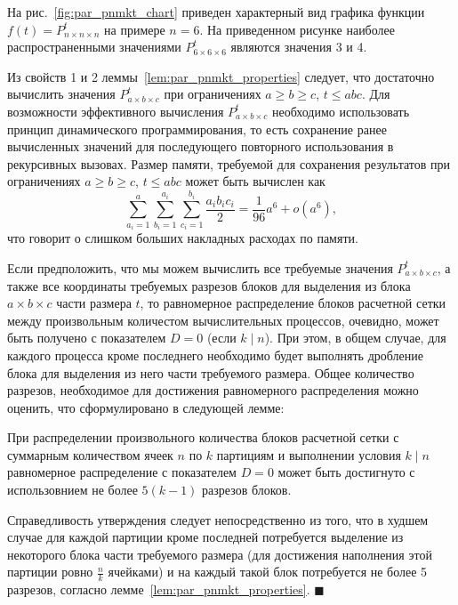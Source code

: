 На рис.~\ref{fig:par_pnmkt_chart} приведен характерный вид графика функции $f(t) = P_{n \times n \times n}^t$ на примере $n = 6$.
На приведенном рисунке наиболее распространенными значениями $P_{6 \times 6 \times 6}^t$ являются значения 3 и 4.

Из свойств 1 и 2 леммы~\ref{lem:par_pnmkt_properties} следует, что достаточно вычислить значения $P_{a \times b \times c}^t$ при ограничениях $a \ge b \ge c$, $t \le abc$.
Для возможности эффективного вычисления $P_{a \times b \times c}^t$ необходимо использовать принцип динамического программирования, то есть сохранение ранее вычисленных значений для последующего повторного использования в рекурсивных вызовах.
Размер памяти, требуемой для сохранения результатов при ограничениях $a \ge b \ge c$, $t \le abc$ может быть вычислен как
\begin{equation}
	\sum_{a_i = 1}^{a}{ \sum_{b_i = 1}^{a_i}{ \sum_{c_i = 1}^{b_i}{ \frac{a_i b_i c_i}{2} } } } = \frac{1}{96} a^6 + o(a^6),
\end{equation}
что говорит о слишком больших накладных расходах по памяти.

Если предположить, что мы можем вычислить все требуемые значения $P_{a \times b \times c}^t$, а также все координаты требуемых разрезов блоков для выделения из блока $a \times b \times c$ части размера $t$, то равномерное распределение блоков расчетной сетки между произвольным количестом вычислительных процессов, очевидно, может быть получено с показателем $D = 0$ (если $k \mid n$).
При этом, в общем случае, для каждого процесса кроме последнего необходимо будет выполнять дробление блока для выделения из него части требуемого размера.
Общее количество разрезов, необходимое для достижения равномерного распределения можно оценить, что сформулировано в следующей лемме:

\begin{lemma}
При распределении произвольного количества блоков расчетной сетки с суммарным количеством ячеек $n$ по $k$ партициям и выполнении условия $k \mid n$ равномерное распределение с показателем $D = 0$ может быть достигнуто с использовнием не более $5(k - 1)$ разрезов блоков.
\end{lemma}

Справедливость утверждения следует непосредственно из того, что в худшем случае для каждой партиции кроме последней потребуется выделение из некоторого блока части требуемого размера (для достижения наполнения этой партиции ровно $\frac{n}{k}$ ячейками) и на каждый такой блок потребуется не более 5 разрезов, согласно лемме~\ref{lem:par_pnmkt_properties}.
$\blacksquare$\\

